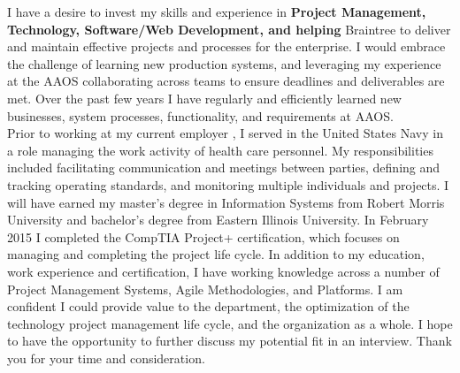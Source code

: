 \documentclass[9pt, a4paper]{awesome-cv}
\begin{document}
\begin{cvletter}
I have a desire to invest my skills and experience in \textbf{Project Management, Technology, Software/Web Development, and helping}
Braintree
to deliver and maintain effective projects and processes for the enterprise. I would embrace the challenge of learning new production systems, and leveraging my experience at the AAOS collaborating across teams to ensure deadlines and deliverables are met. Over the past few years I have regularly and efficiently learned new businesses, system processes, functionality, and requirements at AAOS.\\

Prior to working at my current employer , I served in the  United States Navy in a role managing the work activity of health care personnel. My responsibilities included facilitating communication and meetings between parties, defining and tracking operating standards, and monitoring multiple individuals and projects. I will have earned my master’s degree in Information Systems from Robert Morris University and bachelor’s degree from Eastern Illinois University. In February 2015 I completed the CompTIA Project+ certification, which focuses on managing and completing the project life cycle. In addition to my education, work experience and certification, I have working knowledge across a number of Project Management Systems, Agile Methodologies, and Platforms. I am confident I could provide value to the department, the optimization of the technology project management life cycle, and the organization as a whole. I hope to have the opportunity to further discuss my potential fit in an interview. Thank you for your time and consideration.

\end{cvletter}

\makeletterclosing
\end{document}
